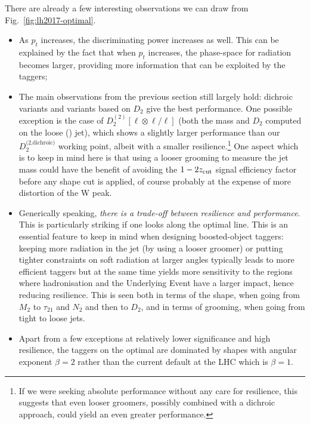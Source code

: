 There are already a few interesting observations we can draw from
Fig.~\ref{fig:lh2017-optimal}.
\begin{itemize}
\item As $p_t$ increases, the discriminating power increases as
  well. This can be explained by the fact that when $p_t$ increases,
  the phase-space for radiation becomes larger, providing more
  information that can be exploited by the taggers;
\item The main observations from the previous section still largely
  hold: dichroic variants and variants based on $D_2$ give the best
  performance.
  One possible exception is the case of
  $D_2^{(2)}[\ell\otimes\ell/\ell]$ (\ie both the mass and $D_2$
  computed on the loose (\SD) jet), which shows a slightly larger
  performance than our $D_2^\text{(2,dichroic)}$ working point, albeit
  with a smaller resilience.\footnote{If we were seeking absolute
    performance without any care for resilience, this suggests that
    even looser groomers, possibly combined with a dichroic approach,
    could yield an even greater performance.}
  One aspect which is to keep in mind here is that using a looser
  grooming to measure the jet mass could have the benefit of avoiding
  the $1-2z_{\text{cut}}$ signal efficiency factor before any shape cut is
  applied, of course probably at the expense of more distortion of the
  W peak.
\item Generically speaking, {\em there is a trade-off between
    resilience and performance}.
  This is particularly striking if one looks along the optimal
  line.
  This is an essential feature to keep in mind when designing
  boosted-object taggers: keeping more radiation in the jet (by using
  a looser groomer) or putting tighter constraints on soft radiation
  at larger angles typically leads to more efficient taggers but at
  the same time yields more sensitivity to the regions where
  hadronisation and the Underlying Event have a larger impact, hence
  reducing resilience.
  This is seen both in terms of the shape, when going from $M_2$ to
  $\tau_{21}$ and $N_2$ and then to $D_2$, and in terms of grooming,
  when going from tight to loose jets. 
\item Apart from a few exceptions at relatively lower significance and
  high resilience, the taggers on the optimal are dominated by shapes
  with angular exponent $\beta=2$ rather than the current default at
  the LHC which is $\beta=1$.
\end{itemize}


